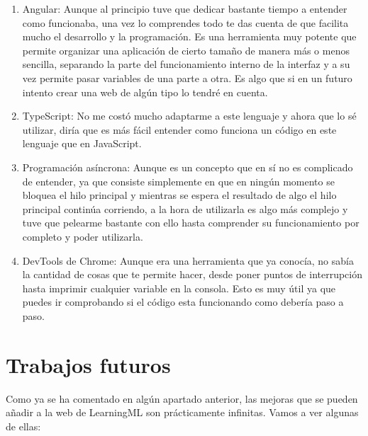 \documentclass[a4paper, 12pt]{book}
\begin{document}
\begin{enumerate}
  \item Angular: Aunque al principio tuve que dedicar bastante tiempo a entender como funcionaba, una vez lo comprendes todo te das cuenta de que facilita mucho el desarrollo y la programación. Es una herramienta muy potente que permite organizar una aplicación de cierto tamaño de manera más o menos sencilla, separando la parte del funcionamiento interno de la interfaz y a su vez permite pasar variables de una parte a otra. Es algo que si en un futuro intento crear una web de algún tipo lo tendré en cuenta.

  \item TypeScript: No me costó mucho adaptarme a este lenguaje y ahora que lo sé utilizar, diría que es más fácil entender como funciona un código en este lenguaje que en JavaScript.

  \item Programación asíncrona:  Aunque es un concepto que en sí no es complicado de entender, ya que consiste simplemente en que en ningún momento se bloquea el hilo principal y mientras se espera el resultado de algo el hilo principal continúa corriendo, a la hora de utilizarla es algo más complejo y tuve que pelearme bastante con ello hasta comprender su funcionamiento por completo y poder utilizarla.

  \item DevTools de Chrome: Aunque era una herramienta que ya conocía, no sabía la cantidad de cosas que te permite hacer, desde poner puntos de interrupción hasta imprimir cualquier variable en la consola. Esto es muy útil ya que puedes ir comprobando si el código esta funcionando como debería paso a paso.
\end{enumerate}



\section{Trabajos futuros}
\label{sec:trabajos_futuros}

Como ya se ha comentado en algún apartado anterior, las mejoras que se pueden añadir a la web de LearningML son prácticamente infinitas. Vamos a ver algunas de ellas: 
\end{document}
